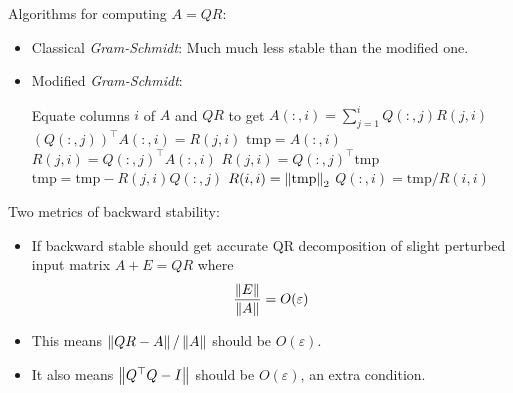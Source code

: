 \documentclass[11pt]{article}
\numberwithin{equation}{section}
\begin{document}
Algorithms for computing $A=QR$:
\begin{itemize}
    \item Classical \textit{Gram-Schmidt}: Much much less stable than the modified one.
    \item Modified \textit{Gram-Schmidt}:
    \begin{savenotes}
        \begin{algorithmfrm}
            \begin{algorithmic}[1]
                \State Equate columns $i$ of $A$ and $QR$ to get $A(:,i) = \sum^{i}_{j=1} Q(:,j)R(j,i)$
                \State $(Q(:,j))^\top A(:,i) = R(j,i)$
                    \State $\mathrm{tmp}=A(:,i)$
                        \State $R(j,i) = Q(:,j)^\top A(:,i)$
                        \State $R(j,i) = Q(:,j)^\top \mathrm{tmp}$
                        \State $\mathrm{tmp} = \mathrm{tmp} - R(j,i)Q(:,j)$
                    \EndFor
                    \State $R(i,i) = \left\| \mathrm{tmp} \right\|_2$
                    \State $Q(:,i) = \mathrm{tmp} /R(i,i)$
                \EndFor
            \end{algorithmic}
        \end{algorithmfrm}
    \end{savenotes}
\end{itemize}

Two metrics of backward stability:\begin{itemize}
    \item[] If backward stable should get accurate QR decomposition of slight perturbed input matrix $A+E = QR$ where \begin{align*}
        \frac{\left\| E \right\|}{\left\| A \right\|} = O(\varepsilon)
    \end{align*}
    \item This means $\left\| QR-A \right\|/\left\| A \right\|$ should be $O(\varepsilon)$. 
    \item It also means $\left\| Q^\top Q-I \right\|$ should be $O(\varepsilon)$, an extra condition.
\end{itemize}
\end{document}
